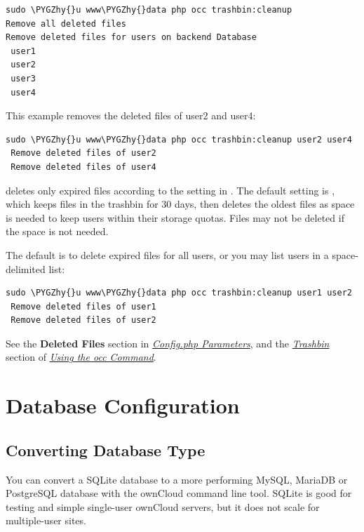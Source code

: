 \documentclass[letterpaper,10pt,english]{sphinxmanual}
\def\PYGZhy{\char`\-}
\begin{document}
\begin{Verbatim}[commandchars=\\\{\}]
sudo \PYGZhy{}u www\PYGZhy{}data php occ trashbin:cleanup
Remove all deleted files
Remove deleted files for users on backend Database
 user1
 user2
 user3
 user4
\end{Verbatim}

This example removes the deleted files of user2 and user4:

\begin{Verbatim}[commandchars=\\\{\}]
sudo \PYGZhy{}u www\PYGZhy{}data php occ trashbin:cleanup user2 user4
 Remove deleted files of user2
 Remove deleted files of user4
\end{Verbatim}

 deletes only expired files according to the  setting in . The default setting is , which keeps files in the trashbin for 30 days, then deletes the oldest files as space is needed to keep users within their storage quotas. Files may not be deleted if the space is not needed.

The default is to delete expired files for all users, or you may list users in a space-delimited list:

\begin{Verbatim}[commandchars=\\\{\}]
sudo \PYGZhy{}u www\PYGZhy{}data php occ trashbin:cleanup user1 user2
 Remove deleted files of user1
 Remove deleted files of user2
\end{Verbatim}

See the \textbf{Deleted Files} section in {\hyperref[configuration_server/config_sample_php_parameters::doc]{\emph{Config.php Parameters}}}, and the {\hyperref[configuration_server/occ_command:trashbin-label]{\emph{Trashbin}}} section of {\hyperref[configuration_server/occ_command::doc]{\emph{Using the occ Command}}}.


\chapter{Database Configuration}
\label{configuration_database/index:database-configuration}\label{configuration_database/index::doc}

\section{Converting Database Type}
\label{configuration_database/db_conversion:converting-database-type}\label{configuration_database/db_conversion::doc}
You can convert a SQLite database to a more performing MySQL, MariaDB or
PostgreSQL database with the ownCloud command line tool. SQLite is good for
testing and simple single-user ownCloud servers, but it does not scale for multiple-user sites.
\end{document}
